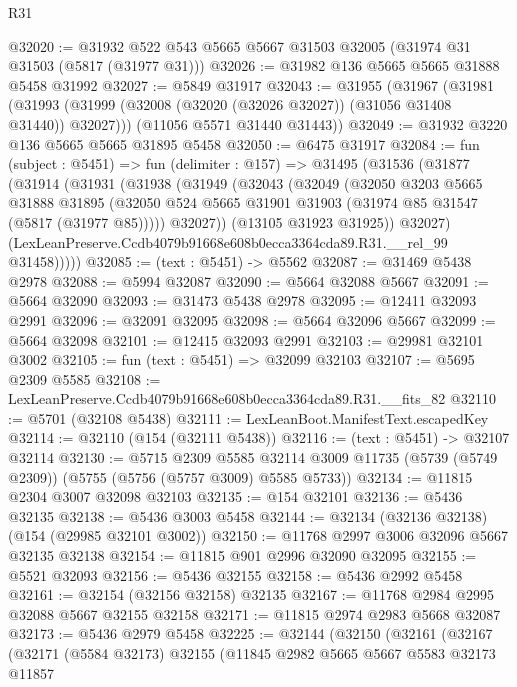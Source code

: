 \begin{lexlean}{R31}
\begin{coremodule}
@32020 := @31932 @522 @543 @5665 @5667 @31503 @32005 (@31974 @31 @31503 (@5817 (@31977 @31)))
@32026 := @31982 @136 @5665 @5665 @31888 @5458 @31992
@32027 := @5849 @31917
@32043 := @31955
    (@31967
      (@31981 (@31993 (@31999 (@32008 (@32020 (@32026 @32027)) (@31056 @31408 @31440)) @32027)))
      (@11056 @5571 @31440 @31443))
@32049 := @31932 @3220 @136 @5665 @5665 @31895 @5458
@32050 := @6475 @31917
@32084 := fun (subject : @5451) =>
  fun (delimiter : @157) =>
  @31495
    (@31536
      (@31877
        (@31914
          (@31931
            (@31938
              (@31949
                (@32043
                  (@32049
                    (@32050
                      @3203
                      @5665
                      @31888
                      @31895
                      (@32050 @524 @5665 @31901 @31903 (@31974 @85 @31547 (@5817 (@31977 @85)))))
                    @32027))
                (@13105 @31923 @31925))
              @32027)
            (LexLeanPreserve.Ccdb4079b91668e608b0ecca3364cda89.R31.__rel_99 @31458)))))
@32085 := (text : @5451) -> @5562
@32087 := @31469 @5438 @2978
@32088 := @5994 @32087
@32090 := @5664 @32088 @5667
@32091 := @5664 @32090
@32093 := @31473 @5438 @2978
@32095 := @12411 @32093 @2991
@32096 := @32091 @32095
@32098 := @5664 @32096 @5667
@32099 := @5664 @32098
@32101 := @12415 @32093 @2991
@32103 := @29981 @32101 @3002
@32105 := fun (text : @5451) => @32099 @32103
@32107 := @5695 @2309 @5585
@32108 := LexLeanPreserve.Ccdb4079b91668e608b0ecca3364cda89.R31.__fits_82
@32110 := @5701 (@32108 @5438)
@32111 := LexLeanBoot.ManifestText.escapedKey
@32114 := @32110 (@154 (@32111 @5438))
@32116 := (text : @5451) -> @32107 @32114
@32130 := @5715
    @2309
    @5585
    @32114
    @3009
    @11735
    (@5739 (@5749 @2309))
    (@5755 (@5756 (@5757 @3009) @5585 @5733))
@32134 := @11815 @2304 @3007 @32098 @32103
@32135 := @154 @32101
@32136 := @5436 @32135
@32138 := @5436 @3003 @5458
@32144 := @32134 (@32136 @32138) (@154 (@29985 @32101 @3002))
@32150 := @11768 @2997 @3006 @32096 @5667 @32135 @32138
@32154 := @11815 @901 @2996 @32090 @32095
@32155 := @5521 @32093
@32156 := @5436 @32155
@32158 := @5436 @2992 @5458
@32161 := @32154 (@32156 @32158) @32135
@32167 := @11768 @2984 @2995 @32088 @5667 @32155 @32158
@32171 := @11815 @2974 @2983 @5668 @32087
@32173 := @5436 @2979 @5458
@32225 := @32144
    (@32150
      (@32161
        (@32167
          (@32171
            (@5584 @32173)
            @32155
            (@11845
              @2982
              @5665
              @5667
              @5583
              @32173
              @11857

\end{coremodule}
\end{lexlean}
